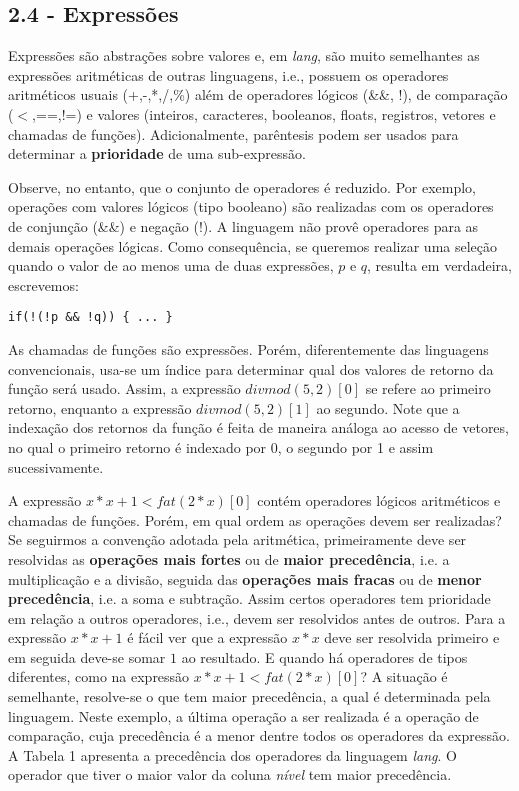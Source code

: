 \documentclass[a4paper,11pt]{article}
\begin{document}
\subsection*{2.4 - Expressões}
\label{sec:org29b2721}

Expressões são abstrações sobre valores e, em \emph{lang}, são muito semelhantes as expressões aritméticas de outras
linguagens, i.e., possuem os operadores aritméticos usuais (+,-,*,/,\%) além de operadores lógicos (\&\&, !), de
comparação (\(<\),==,!=) e  valores (inteiros, caracteres, booleanos, floats, registros, vetores e chamadas de funções).
Adicionalmente, parêntesis podem ser usados para determinar a \textbf{prioridade} de uma sub-expressão.

Observe, no entanto, que o conjunto de operadores é reduzido. Por exemplo, operações com valores lógicos (tipo booleano)
são realizadas com os operadores de conjunção (\&\&) e negação (!).
A linguagem não provê operadores para as demais operações lógicas. Como consequência, se queremos realizar uma seleção
quando o valor de ao menos uma de duas expressões, \(p\) e \(q\), resulta em verdadeira, escrevemos:

\begin{verbatim}
if(!(!p && !q)) { ... }
\end{verbatim}

As chamadas de funções são expressões. Porém, diferentemente das linguagens convencionais, usa-se um índice para determinar
qual dos valores de retorno da função será usado. Assim, a expressão \(divmod(5,2)[0]\) se refere ao primeiro retorno,
enquanto a expressão \(divmod(5,2)[1]\) ao segundo. Note que a indexação dos retornos da função é feita de maneira análoga ao
acesso de vetores, no qual o primeiro retorno é indexado por 0, o segundo por 1 e assim sucessivamente.

A expressão \(x*x+1 < fat(2*x)[0]\) contém operadores lógicos aritméticos e chamadas de funções.
Porém, em qual ordem as operações devem ser realizadas?  Se seguirmos a convenção adotada pela aritmética, primeiramente deve
ser resolvidas as \textbf{operações mais fortes} ou de \textbf{maior precedência}, i.e. a multiplicação e a divisão, seguida das
\textbf{operações mais fracas} ou de \textbf{menor precedência}, i.e. a soma e subtração. Assim certos operadores tem prioridade em relação
a outros operadores, i.e., devem ser resolvidos antes de outros.
Para a expressão \(x*x+1\) é fácil ver que a expressão \(x*x\) deve ser resolvida primeiro e em seguida deve-se somar \(1\) ao resultado.
E quando há operadores de tipos diferentes, como na expressão \(x*x+1 < fat(2*x)[0]\)?
A situação é semelhante, resolve-se o que tem maior precedência, a qual é determinada pela linguagem.
Neste exemplo, a última operação a ser realizada é a operação de comparação, cuja precedência é a menor dentre todos os
operadores da expressão. A Tabela 1 apresenta a precedência dos operadores da linguagem \emph{lang}.
O operador que tiver o maior valor da coluna \emph{nível} tem maior precedência.
\end{document}
